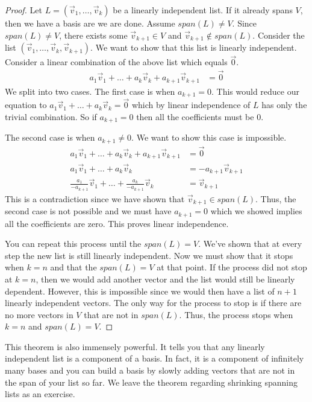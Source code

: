 \begin{proof}
    Let $L=(\vec{v}_1,\ldots,\vec{v}_k)$ be a linearly independent list. If it already spans $V$, then we have a basis are we are done. Assume $span(L)\neq V$. Since $span(L)\neq V$, there exists some $\vec{v}_{k+1}\in V$ and $\vec{v}_{k+1}\notin span(L)$. Consider the list $(\vec{v}_1,\ldots,\vec{v}_k,\vec{v}_{k+1})$. We want to show that this list is linearly independent. Consider a linear combination of the above list which equals $\vec{0}$.
    \begin{align*}
        a_1\vec{v}_1+\ldots+a_k\vec{v}_k+a_{k+1}\vec{v}_{k+1}&=\vec{0}
    \end{align*}
    We split into two cases. The first case is when $a_{k+1}=0$. This would reduce our equation to $a_1\vec{v}_1+\ldots+a_k\vec{v}_k=\vec{0}$ which by linear independence of $L$ has only the trivial combination. So if $a_{k+1}=0$ then all the coefficients must be $0$.

    The second case is when $a_{k+1}\neq 0$. We want to show this case is impossible.
    \begin{align*}
        a_1\vec{v}_1+\ldots+a_k\vec{v}_k+a_{k+1}\vec{v}_{k+1}&=\vec{0}\\
        a_1\vec{v}_1+\ldots+a_k\vec{v}_k&=-a_{k+1}\vec{v}_{k+1}\\
        \frac{a_1}{-a_{k+1}}\vec{v}_1+\ldots+\frac{a_k}{-a_{k+1}}\vec{v}_k&=\vec{v}_{k+1}
    \end{align*}
    This is a contradiction since we have shown that $\vec{v}_{k+1}\in span(L)$. Thus, the second case is not possible and we must have $a_{k+1}=0$ which we showed implies all the coefficients are zero. This proves linear independence.

    You can repeat this process until the $span(L)=V$. We've shown that at every step the new list is still linearly independent. Now we must show that it stops when $k=n$ and that the $span(L)=V$ at that point. If the process did not stop at $k=n$, then we would add another vector and the list would still be linearly dependent. However, this is impossible since we would then have a list of $n+1$ linearly independent vectors. The only way for the process to stop is if there are no more vectors in $V$ that are not in $span(L)$. Thus, the process stops when $k=n$ and $span(L)=V$.
\end{proof}
This theorem is also immensely powerful. It tells you that any linearly independent list is a component of a basis. In fact, it is a component of infinitely many bases and you can build a basis by slowly adding vectors that are not in the span of your list so far. We leave the theorem regarding shrinking spanning lists as an exercise.

